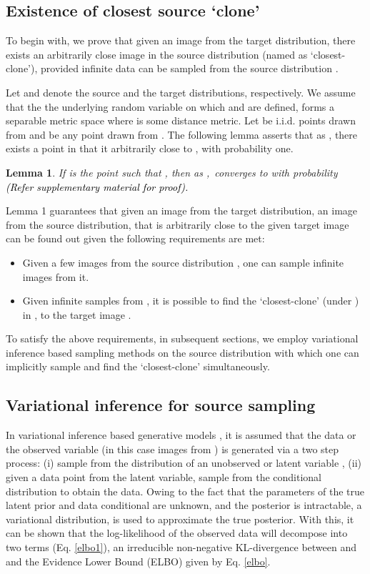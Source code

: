 \documentclass[journal,twoside,web]{IEEEtran}
\newtheorem{lemma}{Lemma}
\newcommand{\bb}{\textcolor{black}}
\begin{document}
\subsection{Existence of closest source `clone' }
To begin with, we prove that given an image from the target distribution, there exists an arbitrarily close image in the source distribution (named as `closest-clone'), provided infinite data can be sampled from the source distribution \cite{cover1967nearest}. \par Let  and  denote the source and the target distributions, respectively. We assume that the the underlying random variable on which   and  are defined, forms a separable metric space  where  is some distance metric. Let  be i.i.d. points drawn from  and  be any point drawn from . The following lemma asserts that as , there exists a point in  that it arbitrarily close to , with probability one.

\begin{lemma}

If  is the point such that , then as ,\   converges to   with probability   \bb{(Refer supplementary material for proof).} 
\end{lemma} 

Lemma 1 guarantees that given an image from the target distribution, an image from the source distribution, that is arbitrarily close to the given target image can be found out given the following requirements are met:
 \begin{itemize}
    \item Given a few images from the source distribution , one can sample infinite images from it. 
    \item Given infinite samples from , it is possible to find the `closest-clone' (under ) in , to the target image .
 \end{itemize}
To satisfy the above requirements, in subsequent sections, we employ variational inference based sampling methods on the source distribution with which one can implicitly sample and find the `closest-clone' simultaneously. 
\subsection{Variational inference for source sampling}
In variational inference based generative models \cite{kingma2013auto}, it is assumed that the data or the observed variable (in this case images from ) is generated via a two step process: (i) sample from the distribution  of an unobserved or latent variable , (ii) given a data point from the latent variable, sample from the conditional distribution  to obtain the data. Owing to the fact that the parameters of the true latent prior  and data conditional  are unknown, and  the posterior  is intractable, a variational distribution,  is used to approximate the true posterior. With this, it can be shown that the log-likelihood of the observed data will decompose into two terms (Eq. \ref{elbo1}), an irreducible non-negative KL-divergence between   and   and the Evidence Lower Bound (ELBO) given by Eq. \ref{elbo}. 
\end{document}
